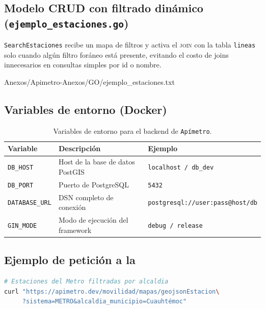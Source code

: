 \subsection*{Modelo CRUD con filtrado dinámico
(\texttt{ejemplo\_estaciones.go})}

\texttt{SearchEstaciones} recibe un mapa de filtros y activa el \textsc{join}
con la tabla \texttt{lineas} solo cuando algún filtro foráneo está presente,
evitando el costo de joins innecesarios en consultas simples por id o nombre.

 {Anexos/Apimetro-Anexos/GO/ejemplo_estaciones.txt}

\subsection*{Variables de entorno (Docker)}

\begin{table}[ht]
    \centering
    \begin{tabular}{|l|l|l|}
        \hline
        \textbf{Variable} & \textbf{Descripción} & \textbf{Ejemplo} \\ \hline
        \texttt{DB\_HOST}      & Host de la base de datos PostGIS  & \texttt{localhost / db\_dev}            \\ \hline
        \texttt{DB\_PORT}      & Puerto de PostgreSQL               & \texttt{5432}                           \\ \hline
        \texttt{DATABASE\_URL} & DSN completo de conexión           & \texttt{postgresql://user:pass@host/db} \\ \hline
        \texttt{GIN\_MODE}     & Modo de ejecución del framework    & \texttt{debug / release}               \\ \hline
    \end{tabular}
    \caption{Variables de entorno para el backend de \texttt{Apímetro}.}
    \label{tab:env-vars}
\end{table}

\subsection*{Ejemplo de petición a la \api{}}

\begin{lstlisting}[language=bash,
    caption={Petición \texttt{curl} para obtener estaciones del Metro
             en la alcaldía Cuauhtémoc.},
    label=lst:api-query]
# Estaciones del Metro filtradas por alcaldia
curl "https://apimetro.dev/movilidad/mapas/geojsonEstacion\
     ?sistema=METRO&alcaldia_municipio=Cuauhtémoc"
\end{lstlisting}
